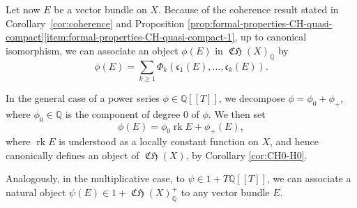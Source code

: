 \documentclass[11pt]{article}
\newcommand{\llbracket}{[\![}
\newcommand{\rrbracket}{]\!]}
\theoremstyle{plain}
\theoremstyle{definition}
\newcommand{\QBbb}{\mathbb Q}
\newcommand{\cfrak}{\mathfrak c}
\DeclareMathOperator{\CHfrak}{\mathfrak{CH}}
\DeclareMathOperator{\rk}{rk}
\begin{document}
Let now $E$ be a vector bundle on $X$. Because of the coherence result stated in Corollary~\ref{cor:coherence} and Proposition \ref{prop:formal-properties-CH-quasi-compact}\eqref{item:formal-properties-CH-quasi-compact-1}, up to canonical isomorphism, we can associate an object $\phi(E)$ in $\CHfrak(X)_{\QBbb}$ by
\begin{displaymath}
\phi(E)=\sum_{k\geq 1}\Phi_{k}(\cfrak_{1}(E),\ldots, \cfrak_{k}(E)).
\end{displaymath}

In the general case of a power series $\phi\in\QBbb\llbracket T\rrbracket$, we decompose $\phi=\phi_{0}+\phi_{+}$, where $\phi_{0}\in\QBbb$ is the component of degree 0 of $\phi$. We then set
\begin{displaymath}
\phi(E)=\phi_{0}\rk E +\phi_{+}(E),
\end{displaymath}
where $\rk E$ is understood as a locally constant function on $X$, and hence canonically defines an object of $\CHfrak(X)$, by Corollary \ref{cor:CH0-H0}.

Analogously, in the multiplicative case, to $\psi\in 1+T\QBbb\llbracket T\rrbracket$, we can associate a natural object $\psi(E) \in 1+\CHfrak(X)_{\QBbb}^{+}$ to any vector bundle $E$.
\end{document}
